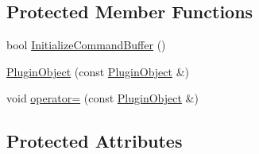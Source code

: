 \subsection*{Protected Member Functions}
\begin{DoxyCompactItemize}
\item 
bool \hyperlink{class_plugin_object_add4437ed89953c9617ef7bd07ae32194}{InitializeCommandBuffer} ()
\item 
\hyperlink{class_plugin_object_ae85850715a04982f81d10136eca3b4f0}{PluginObject} (const \hyperlink{class_plugin_object}{PluginObject} \&)
\item 
void \hyperlink{class_plugin_object_a45243a3f962f41eb71fe0eeba7501262}{operator=} (const \hyperlink{class_plugin_object}{PluginObject} \&)
\end{DoxyCompactItemize}
\subsection*{Protected Attributes}
